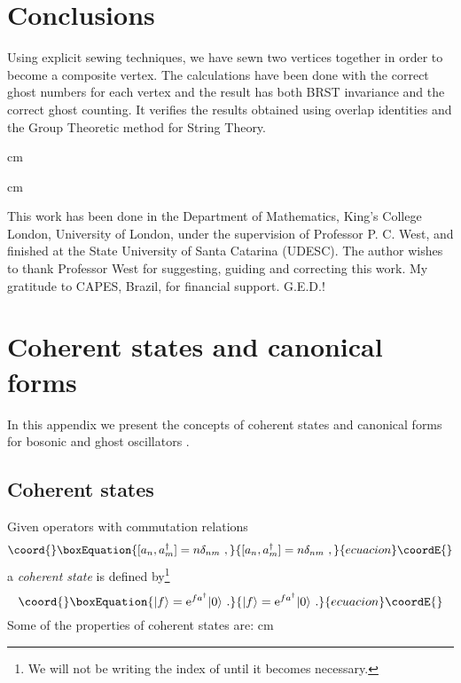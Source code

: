 \documentclass[a4paper,11pt]{article}
\begin{document}
\section{Conclusions}

Using explicit sewing techniques, we have sewn two vertices together in order to become a composite vertex. The calculations have been done with the correct ghost numbers for each vertex and the result has both BRST invariance and the correct ghost counting. It verifies the results obtained using overlap identities and the Group Theoretic method for String Theory.

 cm


 cm

This work has been done in the Department of Mathematics, King's College London, University of London, under the supervision of Professor P. C. West, and finished at the State University of Santa Catarina (UDESC). The author wishes to thank Professor West for suggesting, guiding and correcting this work. My gratitude to CAPES, Brazil, for financial support. G.E.D.!

\appendix

\section{Coherent states and canonical forms}

In this appendix we present the concepts of coherent states and canonical forms for bosonic and ghost oscillators \cite{cg1} \cite{cg2}.

\subsection{Coherent states}

Given operators \coordHE{} with commutation relations
\begin{equation}\coord{}\boxEquation{
[a_n,a_m^\dagger ]=n\delta_{nm}\ ,
}{
[a_n,a_m^\dagger ]=n\delta_{nm}\ ,
}{ecuacion}\coordE{}\end{equation}
a {\sl coherent state} \coordHE{} is defined by\footnote{We will not be writing the index \coordHE{} of \coordHE{} until it becomes necessary.}
\begin{equation}\coord{}\boxEquation{
|f\rangle ={\rm e}^{fa^\dagger }|0\rangle \ .
}{
|f\rangle ={\rm e}^{fa^\dagger }|0\rangle \ .
}{ecuacion}\coordE{}\end{equation}
Some of the properties of coherent states are:
 cm
\end{document}
